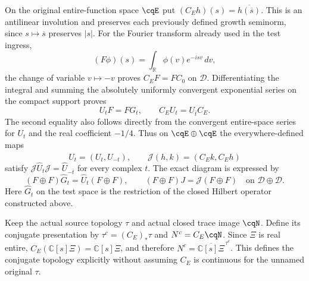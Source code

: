 On the original entire-function space $\cqE$ put
$(C_Eh)(s)=\overline{h(\overline s)}$. This is an antilinear
involution and preserves each previously defined growth seminorm,
since $s\mapsto\overline s$ preserves $|s|$.
For the Fourier transform already used in the test ingress,
\[
 (F\phi)(s)=\int_{\mathbb R}\phi(v)e^{-isv}\,dv,
\]
the change of variable $v\mapsto-v$ proves
$C_EF=FC_0$ on $\mathscr D$. Differentiating the integral and
summing the absolutely uniformly convergent exponential series
on the compact support proves
\begin{equation}
 U_tF=FG_t,\qquad C_EU_t=U_{\overline t}C_E.
 \label{eq:cq-cartan-Fourier-ingress}
\end{equation}
The second equality also follows directly from the convergent
entire-space series for $U_t$ and the real coefficient $-1/4$.
Thus on $\cqE\oplus\cqE$ the everywhere-defined maps
\[
 \widehat U_t=(U_t,U_{-t}),\qquad
 \mathcal J(h,k)=(C_Ek,C_Eh)
\]
satisfy $\mathcal J\widehat U_t\mathcal J
=\widehat U_{-\overline t}$ for every complex $t$. The exact
diagram is expressed by
\[
 (F\oplus F)\widehat G_t=\widehat U_t(F\oplus F),\qquad
 (F\oplus F)J=\mathcal J(F\oplus F)
       \quad\text{on }\mathscr D\oplus\mathscr D.
\]
Here $\widehat G_t$ on the test space is the restriction of
the closed Hilbert operator constructed above.

Keep the actual source topology $\tau$ and actual closed
trace image $\cqN$. Define its conjugate presentation by
$\tau^c=(C_E)_*\tau$ and $N^c=C_E\cqN$.
Since $\Xi$ is real entire, $C_E(\mathbb C[s]\Xi)
=\mathbb C[s]\Xi$, and therefore
$N^c=\overline{\mathbb C[s]\Xi}^{\,\tau^c}$.
This defines the conjugate topology explicitly without assuming
$C_E$ is continuous for the unnamed original $\tau$.

